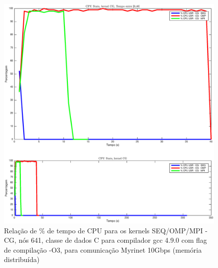 \documentclass[conference,compsoc]{IEEEtran}
\begin{document}
\begin{figure}[H]
\centering
\includegraphics[width=1.1\columnwidth]{EPS/dstat_CG_seq_vs_omp_vs_mpi/cpu.eps}
\caption{Relação de \% de tempo de CPU para os kernels SEQ/OMP/MPI - CG, nós 641, classe de dados C para compilador gcc 4.9.0 com flag de compilação  -O3, para comunicação Myrinet 10Gbps (memória distribuída)}
\label{dstat_cg_SOM_cpu}
\end{figure}
\end{document}

